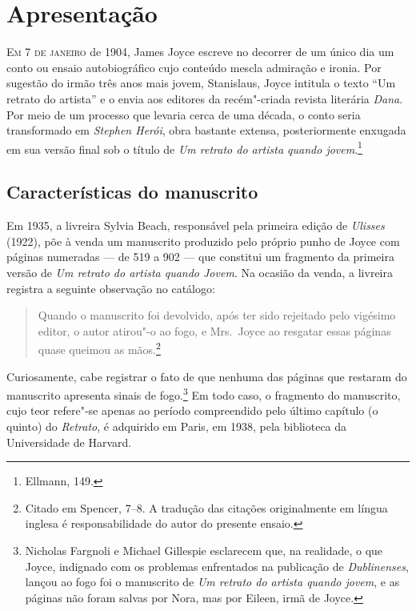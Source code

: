 \chapter[Apresentação, por José Roberto O'Shea]{Apresentação}

\textsc{Em 7 de janeiro} de 1904, James Joyce escreve no decorrer de um único dia
um conto ou ensaio autobiográfico cujo conteúdo mescla admiração e
ironia.  Por sugestão do irmão três anos mais jovem, Stanislaus, Joyce
intitula o texto “Um retrato do artista” e o envia aos editores da
recém"-criada revista literária \textit{Dana}.  Por meio de um processo
que levaria  cerca de uma década, o conto seria transformado em
\textit{Stephen Herói}, obra bastante extensa, posteriormente enxugada
em sua versão final sob o título de \textit{Um retrato do artista
quando jovem}.\footnote{ Ellmann, 149.}		


\section*{Características do manuscrito}

Em 1935, a livreira Sylvia Beach, responsável pela primeira edição de
\textit{Ulisses} (1922), põe à venda um manuscrito produzido pelo
próprio punho de Joyce com páginas numeradas --- de 519 a 902 --- que
constitui um fragmento da primeira versão de \textit{Um retrato do
artista quando Jovem}.  Na ocasião da venda, a livreira registra a
seguinte observação no catálogo: 

\begin{quote}
Quando o manuscrito foi devolvido,
após ter sido rejeitado pelo vigésimo editor, o autor atirou"-o ao fogo,
e Mrs.~Joyce ao resgatar essas páginas quase queimou as mãos.\footnote{
Citado em Spencer, 7--8. A tradução das citações originalmente em
língua inglesa é responsabilidade do autor do presente ensaio.} 
\end{quote}

Curiosamente, cabe registrar o fato de que nenhuma das páginas que
restaram do manuscrito apresenta sinais de fogo.\footnote{ Nicholas Fargnoli e Michael Gillespie 
esclarecem que, na realidade, o que Joyce, indignado com os problemas enfrentados na publicação 
de \textit{Dublinenses}, lançou ao fogo foi o manuscrito de \textit{Um retrato do artista quando jovem}, 
e as páginas não foram salvas por Nora, mas por Eileen, irmã de Joyce.}  Em todo caso, o
fragmento do manuscrito, cujo teor refere"-se apenas ao período
compreendido pelo último capítulo (o quinto) do \textit{Retrato}, é
adquirido em Paris, em 1938, pela biblioteca da Universidade de
Harvard.

